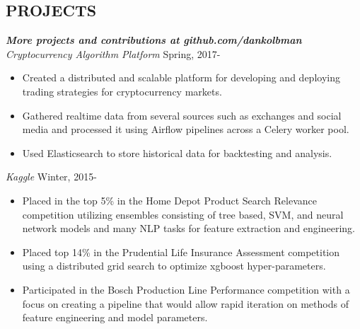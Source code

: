 \documentclass[margin]{res}
\begin{document}
\begin{resume}


\section{PROJECTS}
  {\sl \textbf{More projects and contributions at github.com/dankolbman}}\\
   {\sl Cryptocurrency Algorithm Platform} \hfill            Spring, 2017- \\
  \begin{itemize}
    \item Created a distributed and scalable platform for developing and deploying trading strategies for cryptocurrency markets.
    \item Gathered realtime data from several sources such as exchanges and social media and processed it using Airflow pipelines across a Celery worker pool.
    \item Used Elasticsearch to store historical data for backtesting and analysis.
  \end{itemize}
  {\sl Kaggle} \hfill            Winter, 2015- \\
  \begin{itemize}
    \item Placed in the top 5\% in the Home Depot Product Search Relevance competition utilizing ensembles consisting of tree based, SVM, and neural network models and many NLP tasks for feature extraction and engineering.
    \item Placed top 14\% in the Prudential Life Insurance Assessment competition using a distributed grid search to optimize xgboost hyper-parameters.
    \item Participated in the Bosch Production Line Performance competition with a focus on creating a pipeline that would allow rapid iteration on methods of feature engineering and model parameters.

\end{itemize}
\end{resume}
\end{document}
